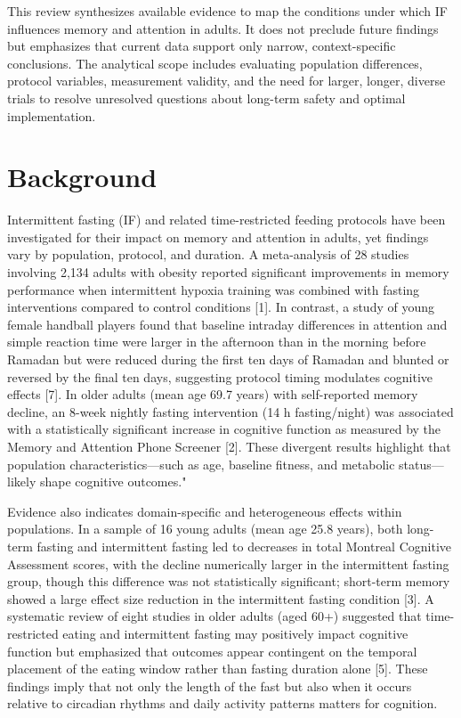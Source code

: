 \documentclass[conference]{IEEEtran}
\begin{document}
This review synthesizes available evidence to map the conditions under which IF influences memory and attention in adults. It does not preclude future findings but emphasizes that current data support only narrow, context-specific conclusions. The analytical scope includes evaluating population differences, protocol variables, measurement validity, and the need for larger, longer, diverse trials to resolve unresolved questions about long-term safety and optimal implementation.

\section{Background}
Intermittent fasting (IF) and related time-restricted feeding protocols have been investigated for their impact on memory and attention in adults, yet findings vary by population, protocol, and duration. A meta-analysis of 28 studies involving 2,134 adults with obesity reported significant improvements in memory performance when intermittent hypoxia training was combined with fasting interventions compared to control conditions [1]. In contrast, a study of young female handball players found that baseline intraday differences in attention and simple reaction time were larger in the afternoon than in the morning before Ramadan but were reduced during the first ten days of Ramadan and blunted or reversed by the final ten days, suggesting protocol timing modulates cognitive effects [7]. In older adults (mean age 69.7 years) with self-reported memory decline, an 8-week nightly fasting intervention (14 h fasting/night) was associated with a statistically significant increase in cognitive function as measured by the Memory and Attention Phone Screener [2]. These divergent results highlight that population characteristics—such as age, baseline fitness, and metabolic status—likely shape cognitive outcomes."

Evidence also indicates domain-specific and heterogeneous effects within populations. In a sample of 16 young adults (mean age 25.8 years), both long-term fasting and intermittent fasting led to decreases in total Montreal Cognitive Assessment scores, with the decline numerically larger in the intermittent fasting group, though this difference was not statistically significant; short-term memory showed a large effect size reduction in the intermittent fasting condition [3]. A systematic review of eight studies in older adults (aged 60+) suggested that time-restricted eating and intermittent fasting may positively impact cognitive function but emphasized that outcomes appear contingent on the temporal placement of the eating window rather than fasting duration alone [5]. These findings imply that not only the length of the fast but also when it occurs relative to circadian rhythms and daily activity patterns matters for cognition.
\end{document}
